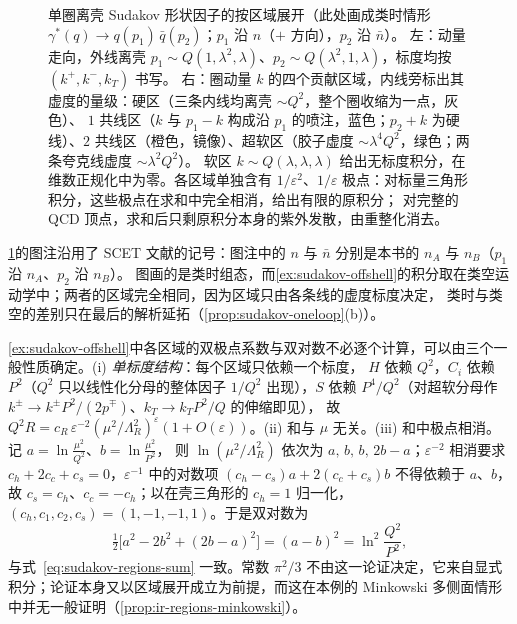 \begin{figure}[htbp]
\caption{单圈离壳 Sudakov 形状因子的按区域展开（此处画成类时情形 $\gamma^*(q)\to q(p_1)\,\bar q(p_2)$；$p_1$ 沿 $n$（$+$ 方向），$p_2$ 沿 $\bar n$）。
左：动量走向，外线离壳 $p_1\sim Q(1,\lambda^2,\lambda)$、$p_2\sim Q(\lambda^2,1,\lambda)$，标度均按 $(k^+,k^-,k_T)$ 书写。
右：圈动量 $k$ 的四个贡献区域，内线旁标出其虚度的量级：硬区（三条内线均离壳 $\sim Q^2$，整个圈收缩为一点，灰色）、
$1$ 共线区（$k$ 与 $p_1-k$ 构成沿 $p_1$ 的喷注，蓝色；$p_2+k$ 为硬线）、$2$ 共线区（橙色，镜像）、超软区（胶子虚度 $\sim\lambda^4Q^2$，绿色；两条夸克线虚度 $\sim\lambda^2Q^2$）。
软区 $k\sim Q(\lambda,\lambda,\lambda)$ 给出无标度积分，在维数正规化中为零。各区域单独含有 $1/\varepsilon^2$、$1/\varepsilon$ 极点：对标量三角形积分，这些极点在求和中完全相消，给出有限的原积分；
对完整的 QCD 顶点，求和后只剩原积分本身的紫外发散，由重整化消去。}
\label{fig:sudakov-ff}
\end{figure}

\cref{fig:sudakov-ff}的图注沿用了 SCET 文献的记号：图注中的 $n$ 与 $\bar n$ 分别是本书的 $n_A$ 与 $n_B$（$p_1$ 沿 $n_A$、$p_2$ 沿 $n_B$）。
图画的是类时组态，而\cref{ex:sudakov-offshell}的积分取在类空运动学中；两者的区域完全相同，因为区域只由各条线的虚度标度决定，
类时与类空的差别只在最后的解析延拓（\cref{prop:sudakov-oneloop}(b)）。

\begin{remark}\label{rem:sudakov-consistency}
\cref{ex:sudakov-offshell}中各区域的双极点系数与双对数不必逐个计算，可以由三个一般性质确定。(i) \emph{单标度结构}：每个区域只依赖一个标度，
$H$ 依赖 $Q^2$，$C_i$ 依赖 $P^2$（$Q^2$ 只以线性化分母的整体因子 $1/Q^2$ 出现），$S$ 依赖 $P^4/Q^2$（对超软分母作 $k^\pm\to k^\pm P^2/(2p^\mp)$、$k_T\to k_TP^2/Q$ 的伸缩即见），
故 $Q^2R=c_R\,\varepsilon^{-2}(\mu^2/\Lambda_R^2)^\varepsilon(1+O(\varepsilon))$。(ii) 和与 $\mu$ 无关。(iii) 和中极点相消。记 $a=\ln\frac{\mu^2}{Q^2}$、$b=\ln\frac{\mu^2}{P^2}$，
则 $\ln(\mu^2/\Lambda_R^2)$ 依次为 $a,\,b,\,b,\,2b-a$；$\varepsilon^{-2}$ 相消要求 $c_h+2c_c+c_s=0$，$\varepsilon^{-1}$ 中的对数项 $(c_h-c_s)a+2(c_c+c_s)b$ 不得依赖于 $a$、$b$，
故 $c_s=c_h$、$c_c=-c_h$；以在壳三角形的 $c_h=1$ 归一化，$(c_h,c_1,c_2,c_s)=(1,-1,-1,1)$。于是双对数为
\[
\tfrac12\big[a^2-2b^2+(2b-a)^2\big]=(a-b)^2=\ln^2\frac{Q^2}{P^2},
\]
与式~\eqref{eq:sudakov-regions-sum} 一致。常数 $\pi^2/3$ 不由这一论证决定，它来自显式积分；论证本身又以区域展开成立为前提，而这在本例的 Minkowski 多侧面情形中并无一般证明（\cref{prop:ir-regions-minkowski}）。
\end{remark}

